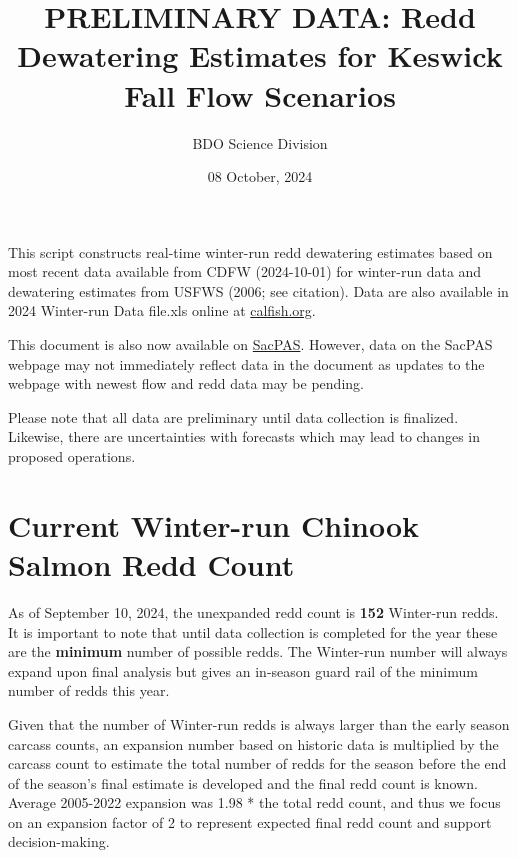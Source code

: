 \documentclass[
]{article}
\title{PRELIMINARY DATA: Redd Dewatering Estimates for Keswick Fall Flow
Scenarios}
\author{BDO Science Division}
\date{08 October, 2024}
\begin{document}
\maketitle

This script constructs real-time winter-run redd dewatering estimates
based on most recent data available from CDFW (2024-10-01) for
winter-run data and dewatering estimates from USFWS (2006; see
citation). Data are also available in 2024 Winter-run Data file.xls
online at
\href{https://gcc02.safelinks.protection.outlook.com/?url=https\%3A\%2F\%2Fwww.calfish.org\%2FProgramsData\%2FConservationandManagement\%2FCentralValleyMonitoring\%2FCDFWUpperSacRiverBasinSalmonidMonitoring.aspx\&data=05\%7C01\%7Clelliott\%40usbr.gov\%7C689ebb9a6c8243b4f96c08da90f5c542\%7C0693b5ba4b184d7b9341f32f400a5494\%7C0\%7C0\%7C637981682646098788\%7CUnknown\%7CTWFpbGZsb3d8eyJWIjoiMC4wLjAwMDAiLCJQIjoiV2luMzIiLCJBTiI6Ik1haWwiLCJXVCI6Mn0\%3D\%7C3000\%7C\%7C\%7C\&sdata=A1eQkWPxbkXxnzEvc2K8\%2FTmslZ8H8zvxdks3\%2F78Yrvw\%3D\&reserved=0}{calfish.org}.

This document is also now available on
\href{https://www.cbr.washington.edu/sacramento/workgroups/usst.html\#redd_dewater}{SacPAS}.
However, data on the SacPAS webpage may not immediately reflect data in
the document as updates to the webpage with newest flow and redd data
may be pending.

Please note that all data are preliminary until data collection is
finalized. Likewise, there are uncertainties with forecasts which may
lead to changes in proposed operations.

\hypertarget{current-winter-run-chinook-salmon-redd-count}{%
\section{Current Winter-run Chinook Salmon Redd
Count}\label{current-winter-run-chinook-salmon-redd-count}}

As of September 10, 2024, the unexpanded redd count is \textbf{152}
Winter-run redds. It is important to note that until data collection is
completed for the year these are the \textbf{minimum} number of possible
redds. The Winter-run number will always expand upon final analysis but
gives an in-season guard rail of the minimum number of redds this year.

Given that the number of Winter-run redds is always larger than the
early season carcass counts, an expansion number based on historic data
is multiplied by the carcass count to estimate the total number of redds
for the season before the end of the season's final estimate is
developed and the final redd count is known. Average 2005-2022 expansion
was 1.98 * the total redd count, and thus we focus on an expansion
factor of 2 to represent expected final redd count and support
decision-making.
\end{document}
